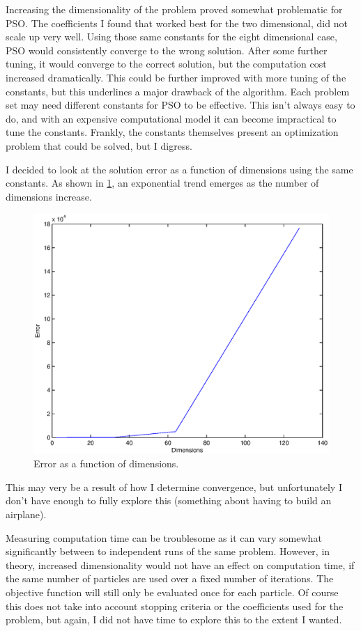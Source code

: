 \documentclass[12pt,parskip=full]{article}
\numberwithin{subsection}{section}
\begin{document}
		Increasing the dimensionality of the problem proved somewhat problematic for PSO. The coefficients I found that
		worked best for the two dimensional, did not scale up very well. Using those same constants for the eight
		dimensional case, PSO would consistently converge to the wrong solution. After some further tuning, it would
		converge to the correct solution, but the computation cost increased dramatically. This could be further improved
		with more tuning of the constants, but this underlines a major drawback of the algorithm. Each problem set may need
		different constants for PSO to be effective. This isn't always easy to do, and with an expensive computational
		model it can become impractical to tune the constants. Frankly, the constants themselves present an optimization
		problem that could be solved, but I digress.
		
		I decided to look at the solution error as a function of dimensions using the same constants. As shown in
		\cref{fig:dimError}, an exponential trend emerges as the number of dimensions increase. 
				
		\begin{figure}[!ht]
			\centering
				\includegraphics[scale=0.9]{DimensionError.eps}
			\caption{Error as a function of dimensions.\label{fig:dimError}}
		\end{figure}
		This may very be a result of how I determine convergence, but unfortunately I don't have enough to fully explore
		this (something about having to build an airplane).
		
		Measuring computation time can be troublesome as it can vary somewhat significantly between to independent runs
		of the same problem. However, in theory, increased dimensionality would not have an effect on computation time,
		if the same number of particles are used over a fixed number of iterations. The objective function will still
		only be evaluated once for each particle. Of course this does not take into account stopping criteria or the
		coefficients used for the problem, but again, I did not have time to explore this to the extent I wanted.
		
\end{document}
